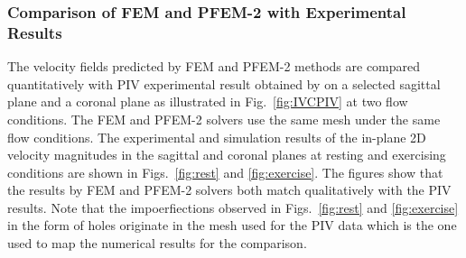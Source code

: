 \subsubsection*{Comparison of FEM and PFEM-2 with Experimental Results}

The velocity fields predicted by FEM and PFEM-2 methods are compared quantitatively with PIV experimental result obtained by \cite{gallagher_exp} on a selected sagittal plane and a coronal plane as illustrated in Fig.~\ref{fig:IVCPIV} at two flow conditions. The FEM and PFEM-2 solvers use the same mesh under the same flow conditions. The experimental and simulation results of the in-plane 2D velocity magnitudes in the sagittal and coronal planes at resting and exercising conditions are shown in Figs.~\ref{fig:rest} and \ref{fig:exercise}. The figures show that the results by FEM and PFEM-2 solvers both match qualitatively with the PIV results. Note that the impoerfiections observed in Figs.~\ref{fig:rest} and \ref{fig:exercise} in the form of holes originate in the mesh used for the PIV data which is the one used to map the numerical results for the comparison.

